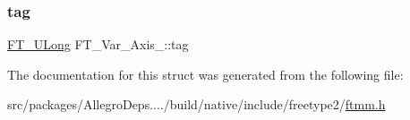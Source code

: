 \mbox{\label{struct_f_t___var___axis___a01ef9396e34e740c2d2b8c7117094624}} 
\subsubsection{\texorpdfstring{tag}{tag}}
{\footnotesize\ttfamily \hyperlink{fttypes_8h_a4fac88bdba78eb76b505efa6e4fbf3f5}{F\+T\+\_\+\+U\+Long} F\+T\+\_\+\+Var\+\_\+\+Axis\+\_\+\+::tag}



The documentation for this struct was generated from the following file\+:\begin{DoxyCompactItemize}
\item 
src/packages/\+Allegro\+Deps..../build/native/include/freetype2/\hyperlink{ftmm_8h}{ftmm.\+h}\end{DoxyCompactItemize}

